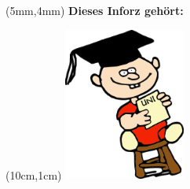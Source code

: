 \thispagestyle{empty}

\begin{textblock*}{10cm}(5mm,4mm)
    \normalsize \textbf{Dieses Inforz gehört:}
\end{textblock*}

\begin{textblock*}{4cm}(10cm,1cm)
    \includegraphics[width=4cm]{../grafik/wesen/wesen_uni}
\end{textblock*}
